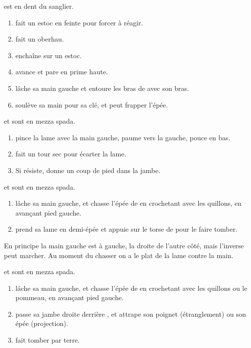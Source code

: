 \begin{technique}

\A est en dent du sanglier.

\begin{enumerate}
	\item \A fait un estoc en feinte pour forcer \D à réagir.
	\item \D fait un oberhau.
	\item \D enchaîne sur un estoc.
	\item \A avance et pare en prime haute.
	\item \A lâche sa main gauche et entoure les bras de \D avec son bras.
	\item \A soulève sa main pour sa clé, et peut frapper l'épée.
\end{enumerate}
\end{technique}


\begin{technique}

\A et \D sont en mezza spada.

\begin{enumerate}
	\item \A pince la lame avec la main gauche, paume vers la gauche, pouce en bas.
	\item \A fait un tour sec pour écarter la lame.
	\item Si \D résiste, \A donne un coup de pied dans la jambe.
\end{enumerate}
\end{technique}


\begin{technique}

\A et \D sont en mezza spada.

\begin{enumerate}
	\item \A lâche sa main gauche, et chasse l'épée de \D en crochetant avec les quillons, en avançant pied gauche.
	\item \A prend sa lame en demi-épée et appuie sur le torse de \D pour le faire tomber.
\end{enumerate}

En principe la main gauche est à gauche, la droite de l'autre côté, mais l'inverse peut marcher.
Au moment du chasser on a le plat de la lame contre la main.
\end{technique}


\begin{technique}

\A et \D sont en mezza spada.

\begin{enumerate}
	\item \A lâche sa main gauche, et chasse l'épée de \D en crochetant avec les quillons ou le pommeau, en avançant pied gauche.
	\item \A passe sa jambe droite derrière \D, et attrape son poignet (étranglement) ou son épée (projection).
	\item \A fait tomber \D par terre.
\end{enumerate}
\end{technique}


